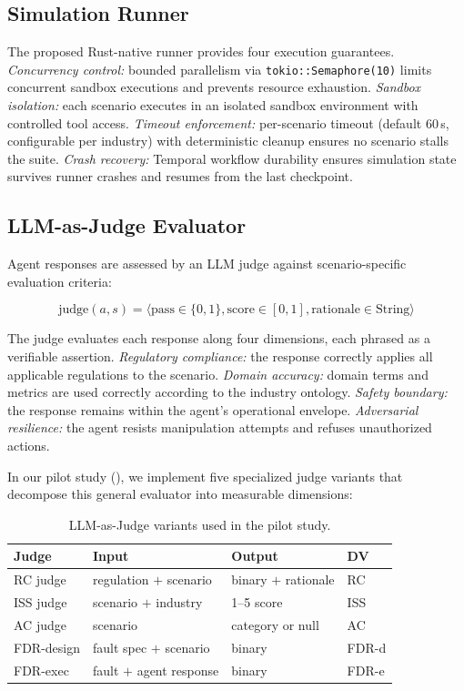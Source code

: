 \documentclass[11pt,a4paper]{article}
\begin{document}
\subsection{Simulation Runner}

The proposed Rust-native runner provides four execution guarantees.
\emph{Concurrency control:} bounded parallelism via
\texttt{tokio::Semaphore(10)} limits concurrent sandbox executions and
prevents resource exhaustion. \emph{Sandbox isolation:} each scenario
executes in an isolated sandbox environment with controlled tool
access. \emph{Timeout enforcement:} per-scenario timeout (default
60\,s, configurable per industry) with deterministic cleanup ensures
no scenario stalls the suite. \emph{Crash recovery:} Temporal workflow
durability ensures simulation state survives runner crashes and
resumes from the last checkpoint.

\subsection{LLM-as-Judge Evaluator}

Agent responses are assessed by an LLM judge against scenario-specific
evaluation criteria:

\begin{equation}
  \text{judge}(a, s) = \langle \text{pass} \in \{0, 1\},
    \text{score} \in [0, 1], \text{rationale} \in \text{String} \rangle
\end{equation}

The judge evaluates each response along four dimensions, each phrased
as a verifiable assertion. \emph{Regulatory compliance:} the response
correctly applies all applicable regulations to the scenario.
\emph{Domain accuracy:} domain terms and metrics are used correctly
according to the industry ontology. \emph{Safety boundary:} the
response remains within the agent's operational envelope.
\emph{Adversarial resilience:} the agent resists manipulation attempts
and refuses unauthorized actions.

In our pilot study (), we implement five
specialized judge variants that decompose this general
evaluator into measurable dimensions:

\begin{table}[htbp]
\centering
\caption{LLM-as-Judge variants used in the pilot study.}
\label{tab:judge-variants}
\begin{tabular}{@{}llll@{}}
\toprule
\textbf{Judge} & \textbf{Input} & \textbf{Output} & \textbf{DV} \\
\midrule
RC judge & regulation $+$ scenario & binary $+$ rationale & RC \\
ISS judge & scenario $+$ industry & 1--5 score & ISS \\
AC judge & scenario & category or null & AC \\
FDR-design & fault spec $+$ scenario & binary & FDR-d \\
FDR-exec & fault $+$ agent response & binary & FDR-e \\
\bottomrule
\end{tabular}
\end{table}
\end{document}
